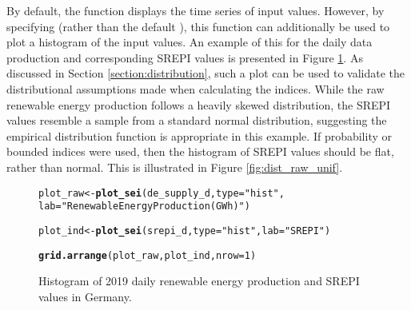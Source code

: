 \documentclass[article,shortnames,nojss]{jss}\usepackage[]{graphicx}\usepackage[]{xcolor}
\makeatletter
\newcommand{\hlnum}[1]{\textcolor[rgb]{0.686,0.059,0.569}{#1}}%
\newcommand{\hlstr}[1]{\textcolor[rgb]{0.192,0.494,0.8}{#1}}%
\newcommand{\hlstd}[1]{\textcolor[rgb]{0.345,0.345,0.345}{#1}}%
\newcommand{\hlkwb}[1]{\textcolor[rgb]{0.69,0.353,0.396}{#1}}%
\newcommand{\hlkwc}[1]{\textcolor[rgb]{0.333,0.667,0.333}{#1}}%
\newcommand{\hlkwd}[1]{\textcolor[rgb]{0.737,0.353,0.396}{\textbf{#1}}}%
\newenvironment{kframe}{%
 \def\at@end@of@kframe{}%
 \ifinner\ifhmode%
  \def\at@end@of@kframe{\end{minipage}}%
  \begin{minipage}{\columnwidth}%
 \fi\fi%
 \def\FrameCommand##1{\hskip\@totalleftmargin \hskip-\fboxsep
 \colorbox{shadecolor}{##1}\hskip-\fboxsep
     \hskip-\linewidth \hskip-\@totalleftmargin \hskip\columnwidth}%
 \MakeFramed {\advance\hsize-\width
   \@totalleftmargin\z@ \linewidth\hsize
   \@setminipage}}%
 {\par\unskip\endMakeFramed%
 \at@end@of@kframe}
\newenvironment{knitrout}{}{} %
\makeatother
\begin{document}
By default, the  function displays the time series of input values. However, by specifying  (rather than the default ), this function can additionally be used to plot a histogram of the input values. An example of this for the daily data production and corresponding SREPI values is presented in Figure \ref{fig:dist_raw}. As discussed in Section \ref{section:distribution}, such a plot can be used to validate the distributional assumptions made when calculating the indices. While the raw renewable energy production follows a heavily skewed distribution, the SREPI values resemble a sample from a standard normal distribution, suggesting the empirical distribution function is appropriate in this example. If probability or bounded indices were used, then the histogram of SREPI values should be flat, rather than normal. This is illustrated in Figure \ref{fig:dist_raw_unif}.


\begin{figure}
\begin{knitrout}
\color{fgcolor}\begin{kframe}
\begin{alltt}
\hlstd{plot_raw} \hlkwb{<-} \hlkwd{plot_sei}\hlstd{(de_supply_d,} \hlkwc{type} \hlstd{=} \hlstr{"hist"}\hlstd{,}
                     \hlkwc{lab} \hlstd{=} \hlstr{"Renewable Energy Production (GWh)"}\hlstd{)}
\end{alltt}


{\ttfamily\noindent\bfseries{}}\begin{alltt}
\hlstd{plot_ind} \hlkwb{<-} \hlkwd{plot_sei}\hlstd{(srepi_d,} \hlkwc{type} \hlstd{=} \hlstr{"hist"}\hlstd{,} \hlkwc{lab} \hlstd{=} \hlstr{"SREPI"}\hlstd{)}
\end{alltt}


{\ttfamily\noindent\bfseries{}}\begin{alltt}
\hlkwd{grid.arrange}\hlstd{(plot_raw, plot_ind,} \hlkwc{nrow} \hlstd{=} \hlnum{1}\hlstd{)}
\end{alltt}


{\ttfamily\noindent\bfseries\color{errorcolor}{\#\# Error in eval(expr, envir, enclos): object 'plot\_raw' not found}}\end{kframe}
\end{knitrout}
\caption{Histogram of 2019 daily renewable energy production and SREPI values in Germany.}
\label{fig:dist_raw}
\end{figure}
\end{document}
